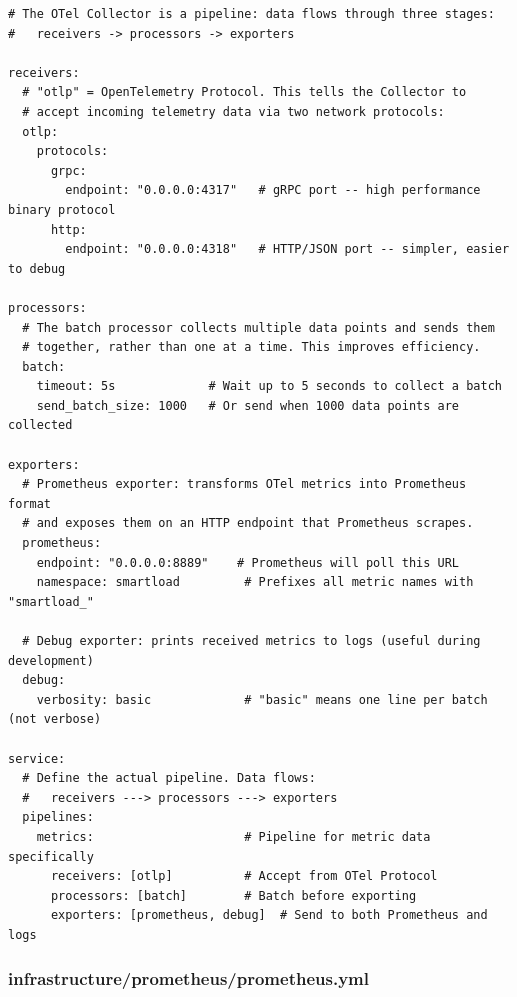 \documentclass[12pt, a4paper]{article}
\begin{document}
\begin{lstlisting}[style=yaml, caption={infrastructure/otel-collector/otelcol-config.yaml}]
# The OTel Collector is a pipeline: data flows through three stages:
#   receivers -> processors -> exporters

receivers:
  # "otlp" = OpenTelemetry Protocol. This tells the Collector to
  # accept incoming telemetry data via two network protocols:
  otlp:
    protocols:
      grpc:
        endpoint: "0.0.0.0:4317"   # gRPC port -- high performance binary protocol
      http:
        endpoint: "0.0.0.0:4318"   # HTTP/JSON port -- simpler, easier to debug

processors:
  # The batch processor collects multiple data points and sends them
  # together, rather than one at a time. This improves efficiency.
  batch:
    timeout: 5s             # Wait up to 5 seconds to collect a batch
    send_batch_size: 1000   # Or send when 1000 data points are collected

exporters:
  # Prometheus exporter: transforms OTel metrics into Prometheus format
  # and exposes them on an HTTP endpoint that Prometheus scrapes.
  prometheus:
    endpoint: "0.0.0.0:8889"    # Prometheus will poll this URL
    namespace: smartload         # Prefixes all metric names with "smartload_"

  # Debug exporter: prints received metrics to logs (useful during development)
  debug:
    verbosity: basic             # "basic" means one line per batch (not verbose)

service:
  # Define the actual pipeline. Data flows:
  #   receivers ---> processors ---> exporters
  pipelines:
    metrics:                     # Pipeline for metric data specifically
      receivers: [otlp]          # Accept from OTel Protocol
      processors: [batch]        # Batch before exporting
      exporters: [prometheus, debug]  # Send to both Prometheus and logs
\end{lstlisting}

\subsubsection{infrastructure/prometheus/prometheus.yml}
\end{document}
